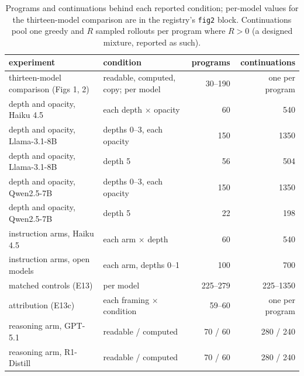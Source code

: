 \begin{table}[h]\centering\small
\begin{tabular}{llrr}\hline
experiment & condition & programs & continuations \\ \hline
thirteen-model comparison (Figs 1, 2) & readable, computed, copy; per model & 30--190 & one per program \\
depth and opacity, Haiku 4.5 & each depth $\times$ opacity & 60 & 540 \\
depth and opacity, Llama-3.1-8B & depths 0--3, each opacity & 150 & 1350 \\
depth and opacity, Llama-3.1-8B & depth 5 & 56 & 504 \\
depth and opacity, Qwen2.5-7B & depths 0--3, each opacity & 150 & 1350 \\
depth and opacity, Qwen2.5-7B & depth 5 & 22 & 198 \\
instruction arms, Haiku 4.5 & each arm $\times$ depth & 60 & 540 \\
instruction arms, open models & each arm, depths 0--1 & 100 & 700 \\
matched controls (E13) & per model & 225--279 & 225--1350 \\
attribution (E13c) & each framing $\times$ condition & 59--60 & one per program \\
reasoning arm, GPT-5.1 & readable / computed & 70 / 60 & 280 / 240 \\
reasoning arm, R1-Distill & readable / computed & 70 / 60 & 280 / 240 \\ \hline
\end{tabular}
\caption{Programs and continuations behind each reported condition; per-model values for the thirteen-model comparison are in the registry's \texttt{fig2} block. Continuations pool one greedy and $R$ sampled rollouts per program where $R>0$ (a designed mixture, reported as such).}
\label{tab:counts}
\end{table}

